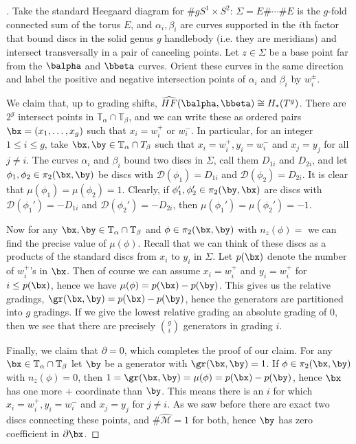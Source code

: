 \begin{example}
\label{standard model calculation of S^1 x S^2}
\begin{proof}[]
Take the standard Heegaard diagram for $\# g S^1 \times S^2$: $\Sigma = E \# \cdots \# E$ is the $g$-fold connected sum of the torus $E$, and $\alpha_i,\beta_i$ are curves supported in the $i$th factor that bound discs in the solid genus $g$ handlebody (i.e. they are meridians) and intersect transversally in a pair of canceling points. Let $z \in \Sigma$ be a base point far from the $\balpha$ and $\bbeta$ curves. Orient these curves in the same direction and label the positive and negative intersection points of $\alpha_i$ and $\beta_i$ by $w_i^\pm$.

We claim that, up to grading shifts, $\widehat{HF}(\balpha,\bbeta) \cong H_*(T^g)$. There are $2^g$ intersect points in $\mathbb T_\alpha \cap \mathbb T_\beta$, and we can write these as ordered pairs $\bx = (x_1,\ldots,x_g)$ such that $x_i = w_i^+$ or $w_i^-$. In particular, for an integer $1 \leq i \leq g$, take $\bx,\by \in \mathbb T_\alpha \cap T_\beta$ such that $x_i=w_i^+,y_i=w_i^-$ and $x_j=y_j$ for all $j \neq i$. The curves $\alpha_i$ and $\beta_i$ bound two discs in $\Sigma$, call them $D_{1i}$ and $D_{2i}$, and let $\phi_1,\phi_2 \in \pi_2(\bx,\by)$ be discs with $\mathcal D(\phi_1)=D_{1i}$ and $\mathcal D(\phi_2)=D_{2i}$. It is clear that $\mu(\phi_1)=\mu(\phi_2)=1$. Clearly, if $\phi_1',\phi_2' \in \pi_2(\by,\bx)$ are discs with $\mathcal D(\phi_1')=-D_{1i}$ and $\mathcal D(\phi_2')=-D_{2i}$, then $\mu(\phi_1')=\mu(\phi_2')=-1$. 

Now for any $\bx,\by \in \mathbb T_\alpha \cap \mathbb T_\beta$ and $\phi \in \pi_2(\bx,\by)$ with $n_z(\phi)=$ we can find the precise value of $\mu(\phi)$. Recall that we can think of these discs as a products of the standard discs from $x_i$ to $y_i$ in $\Sigma$. Let $p(\bx)$ denote the number of $w_i^+$'s in $\bx$. Then of course we can assume $x_i=w_i^+$ and $y_i=w_i^+$ for $i \leq p(\bx)$, hence we have $\mu(\phi)=p(\bx)-p(\by)$. This gives us the relative gradings, $\gr(\bx,\by)=p(\bx)-p(\by)$, hence the generators are partitioned into $g$ gradings. If we give the lowest relative grading an absolute grading of 0, then we see that there are precisely $\binom{g}{i}$ generators in grading $i$.

Finally, we claim that $\partial = 0$, which completes the proof of our claim. For any $\bx \in \mathbb T_\alpha \cap \mathbb T_\beta$ let $\by$ be a generator with $\gr(\bx,\by)=1$. If $\phi \in \pi_2(\bx,\by)$ with $n_z(\phi)=0$, then $1=\gr(\bx,\by)=\mu(\phi)=p(\bx)-p(\by)$, hence $\bx$ has one more $+$ coordinate than $\by$. This means there is an $i$ for which $x_i=w_i^+,y_i=w_i^-$ and $x_j=y_j$ for $j \neq i$. As we saw before there are exact two discs connecting these points, and $\#\widehat{\mathcal M}=1$ for both, hence $\by$ has zero coefficient in $\partial \bx$.


\end{proof}
\end{example}
